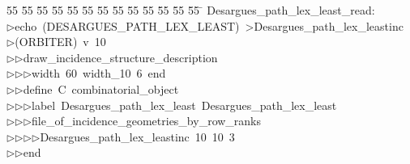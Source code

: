 %
%
\begin{tabbing}
55 \= 55 \= 55 \= 55 \= 55 \= 55 \= 55 \= 55 \= 55 \= 55 \= 55 \= 55 \= 55 \= \kill
Desargues\_path\_lex\_least\_read:\\[0pt]
$\triangleright$\>echo\ (DESARGUES\_PATH\_LEX\_LEAST)\ {\textgreater}Desargues\_path\_lex\_leastinc\\[0pt]
$\triangleright$\>(ORBITER)\ v\ 10\ \\[0pt]
$\triangleright$\>$\triangleright$\>draw\_incidence\_structure\_description\ \\[0pt]
$\triangleright$\>$\triangleright$\>$\triangleright$\>width\ 60\ width\_10\ 6\ end\ \\[0pt]
$\triangleright$\>$\triangleright$\>define\ C\ combinatorial\_object\ \\[0pt]
$\triangleright$\>$\triangleright$\>$\triangleright$\>label\ Desargues\_path\_lex\_least\ Desargues\_path\_lex\_least\ \\[0pt]
$\triangleright$\>$\triangleright$\>$\triangleright$\>file\_of\_incidence\_geometries\_by\_row\_ranks\ \\[0pt]
$\triangleright$\>$\triangleright$\>$\triangleright$\>$\triangleright$\>Desargues\_path\_lex\_leastinc\ 10\ 10\ 3\ \\[0pt]
$\triangleright$\>$\triangleright$\>end\\[0pt]
\end{tabbing}
